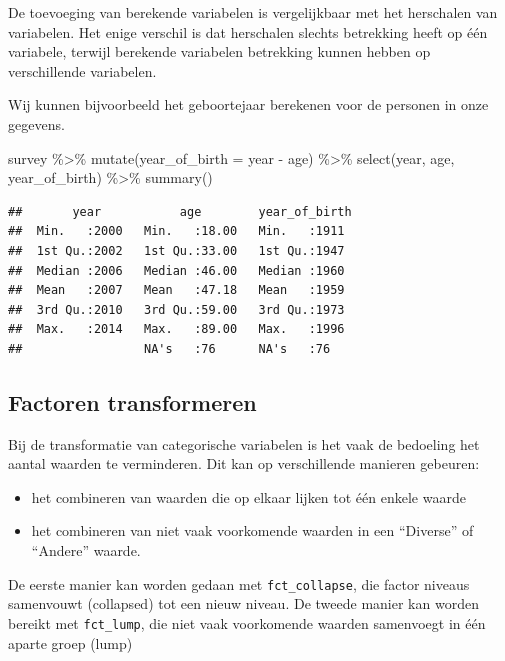 \documentclass[]{tufte-book}
\newenvironment{Shaded}{}{}
\newcommand{\AttributeTok}[1]{\textcolor[rgb]{0.49,0.56,0.16}{#1}}
\newcommand{\FunctionTok}[1]{\textcolor[rgb]{0.02,0.16,0.49}{#1}}
\newcommand{\NormalTok}[1]{#1}
\newcommand{\SpecialCharTok}[1]{\textcolor[rgb]{0.25,0.44,0.63}{#1}}
\providecommand{\tightlist}{%
  \setlength{\itemsep}{0pt}\setlength{\parskip}{0pt}}
\begin{document}
De toevoeging van berekende variabelen is vergelijkbaar met het herschalen van variabelen. Het enige verschil is dat herschalen slechts betrekking heeft op één variabele, terwijl berekende variabelen betrekking kunnen hebben op verschillende variabelen.

Wij kunnen bijvoorbeeld het geboortejaar berekenen voor de personen in onze gegevens.

\begin{Shaded}
\begin{Highlighting}[]
\NormalTok{survey }\SpecialCharTok{\%\textgreater{}\%}
  \FunctionTok{mutate}\NormalTok{(}\AttributeTok{year\_of\_birth =}\NormalTok{ year }\SpecialCharTok{{-}}\NormalTok{ age) }\SpecialCharTok{\%\textgreater{}\%}
  \FunctionTok{select}\NormalTok{(year, age, year\_of\_birth) }\SpecialCharTok{\%\textgreater{}\%}
  \FunctionTok{summary}\NormalTok{()}
\end{Highlighting}
\end{Shaded}

\begin{verbatim}
##       year           age        year_of_birth 
##  Min.   :2000   Min.   :18.00   Min.   :1911  
##  1st Qu.:2002   1st Qu.:33.00   1st Qu.:1947  
##  Median :2006   Median :46.00   Median :1960  
##  Mean   :2007   Mean   :47.18   Mean   :1959  
##  3rd Qu.:2010   3rd Qu.:59.00   3rd Qu.:1973  
##  Max.   :2014   Max.   :89.00   Max.   :1996  
##                 NA's   :76      NA's   :76
\end{verbatim}

\hypertarget{factoren-transformeren}{%
\subsection{Factoren transformeren}\label{factoren-transformeren}}

Bij de transformatie van categorische variabelen is het vaak de bedoeling het aantal waarden te verminderen. Dit kan op verschillende manieren gebeuren:

\begin{itemize}
\tightlist
\item
  het combineren van waarden die op elkaar lijken tot één enkele waarde
\item
  het combineren van niet vaak voorkomende waarden in een ``Diverse'' of ``Andere'' waarde.
\end{itemize}

De eerste manier kan worden gedaan met \texttt{fct\_collapse}, die factor niveaus samenvouwt (collapsed) tot een nieuw niveau. De tweede manier kan worden bereikt met \texttt{fct\_lump}, die niet vaak voorkomende waarden samenvoegt in één aparte groep (lump)
\end{document}
